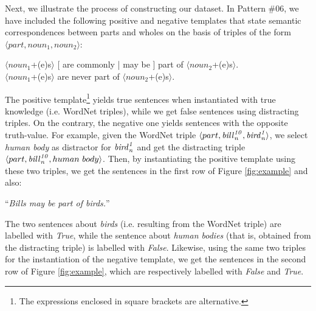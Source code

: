 \documentclass[11pt]{article}
\newcommand{\WORDNET}{WordNet}
\newcommand{\synset}[3]{{\it{#1}_{#3}^{#2}}}
\begin{document}
Next, we illustrate the process of constructing our dataset. In Pattern \#06, we have included the following positive and negative templates that state semantic correspondences between parts and wholes on the basis of triples of the form $\langle part, noun_1, noun_2 \rangle$:
\begin{center}
$\langle noun_1$+(e)s$\rangle$ [ are commonly | may be ] part of $\langle noun_2$+(e)s$\rangle$. \\[5pt]
$\langle noun_1$+(e)s$\rangle$ are never part of $\langle noun_2$+(e)s$\rangle$.
\end{center}
The positive template\footnote{The expressions enclosed in square brackets are alternative.} yields true sentences when instantiated with true knowledge (i.e. \WORDNET{} triples), while we get false sentences using distracting triples. On the contrary, the negative one yields sentences with the opposite truth-value. For example, given the \WORDNET{} triple $\langle part, \synset{bill}{10}{n}, \synset{bird}{1}{n} \rangle$, we select {\it human body} as distractor for $\synset{bird}{1}{n}$ and get the distracting triple $\langle part, \synset{bill}{10}{n}, human~body \rangle$. Then, by instantiating the positive template using these two triples, we get the sentences in the first row of Figure \ref{fig:example} and also:
\begin{center}
``{\it Bills may be part of birds.}''
\end{center}
The two sentences about {\it birds} (i.e. resulting from the \WORDNET{} triple) are labelled with {\it True}, while the sentence about {\it human bodies} (that is, obtained from the distracting triple) is labelled with {\it False}. Likewise, using the same two triples for the instantiation of the negative template, we get the sentences in the second row of Figure \ref{fig:example}, which are respectively labelled with {\it False} and {\it True}.
\end{document}
